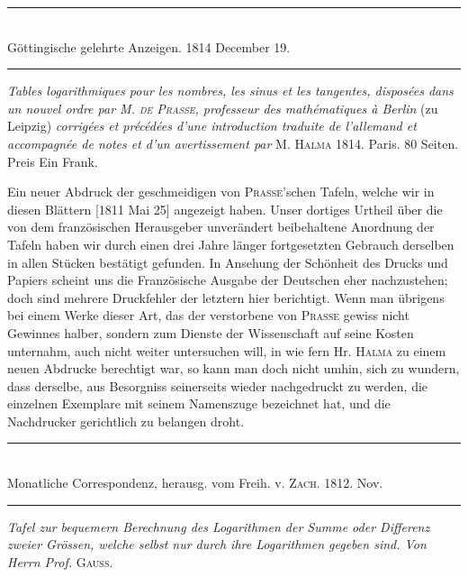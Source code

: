 \par{}
\begin{center}
\rule{0.63\linewidth}{0.3pt}\\
Göttingische gelehrte Anzeigen. 1814 December 19.\\
\rule{0.63\linewidth}{0.3pt}
\end{center}

\emph{Tables logarithmiques pour les nombres, les sinus et les tangentes, disposées
dans un nouvel ordre par M. \textup{\textsc{de Prasse}}, professeur des mathématiques à Berlin} (zu
Leipzig) \emph{corrigées et précédées d’une introduction traduite de l’allemand et accompagnée de notes et d’un avertissement par} M. \textsc{Halma} 1814. Paris. 80 Seiten. Preis
Ein Frank.

Ein neuer Abdruck der geschmeidigen von \textsc{Prasse}’schen Tafeln, welche wir
in diesen Blättern [1811 Mai 25] angezeigt haben. Unser dortiges Urtheil über
die von dem französischen Herausgeber unverändert beibehaltene Anordnung der
Tafeln haben wir durch einen drei Jahre länger fortgesetzten Gebrauch derselben
in allen Stücken bestätigt gefunden. In Ansehung der Schönheit des Drucks und
Papiers scheint uns die Französische Ausgabe der Deutschen eher nachzustehen;
doch sind mehrere Druckfehler der letztern hier berichtigt. Wenn man übrigens
bei einem Werke dieser Art, das der verstorbene von \textsc{Prasse} gewiss nicht Gewinnes halber, sondern zum Dienste der Wissenschaft auf seine Kosten unternahm,
auch nicht weiter untersuchen will, in wie fern Hr. \textsc{Halma} zu einem neuen Abdrucke berechtigt war, so kann man doch nicht umhin, sich zu wundern, dass
derselbe, aus Besorgniss seinerseits wieder nachgedruckt zu werden, die einzelnen Exemplare mit seinem Namenszuge bezeichnet hat, und die Nachdrucker gerichtlich zu belangen droht.
\par{}
\begin{center}
\rule{0.66\linewidth}{0.3pt}\\
Monatliche Correspondenz, herausg. vom Freih. v. \textsc{Zach}. 1812. Nov.\\
\rule{0.66\linewidth}{0.3pt}
\end{center}

\emph{Tafel zur bequemern Berechnung des Logarithmen der Summe oder Differenz
zweier Grössen, welche selbst nur durch ihre Logarithmen gegeben sind. Von Herrn
Prof.} \textsc{Gauss}.


